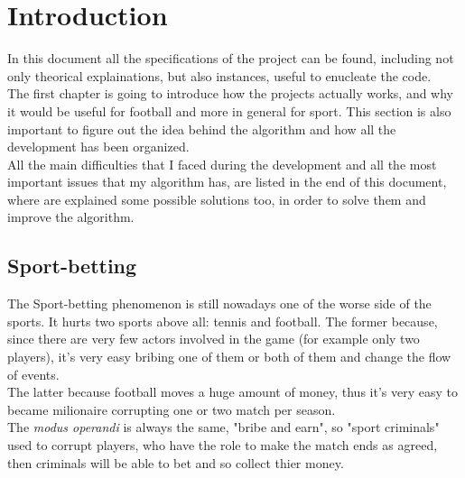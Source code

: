 \documentclass[a4paper,titlepage,11pt]{report}
\begin{document}
{\selectfont
\begin{frontespizio}
\Titolo{\textcolor{black}{Football-betting Detection System}}
\Rientro{2.5cm}
\end{frontespizio}



\pagebreak



\tableofcontents



\chapter{
Introduction}
In this document all the specifications of the project can be found, including not only theorical explainations, but also instances, useful to enucleate the code.\\
The first chapter is going to introduce how the projects actually works, and why it would be useful for football and more in general for sport. This section is also important to figure out the idea behind the algorithm and how all the development has been organized.\\
All the main difficulties that I faced during the development and all the most important issues that my algorithm has, are listed in the end of this document, where are explained some possible solutions too, in order to solve them and improve the algorithm.

\section{
Sport-betting}
The Sport-betting phenomenon is still nowadays one of the worse side of the sports. It hurts two sports above all: tennis and football. The former because, since there are very few actors involved in the game (for example only two players), it's very easy bribing one of them or both of them and change the flow of events.\\
The latter because football moves a huge amount of money, thus it's very easy to became milionaire corrupting one or two match per season.\\
The \textit{modus operandi} is always the same, "bribe and earn", so "sport criminals" used to corrupt players, who have the role to make the match ends as agreed, then criminals will be able to bet and so collect thier money.

}
\end{document}
